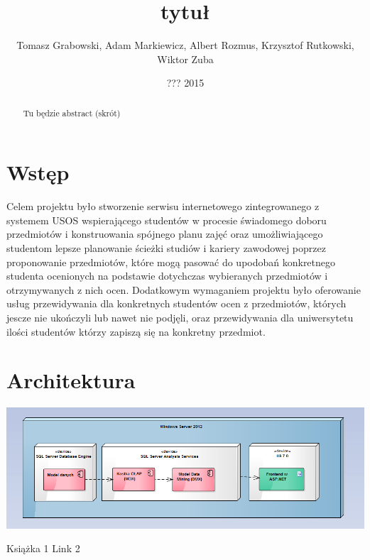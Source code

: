 \documentclass[licencjacka]{pracamgr}
\author{Tomasz Grabowski, Adam Markiewicz, Albert Rozmus, Krzysztof Rutkowski, Wiktor Zuba}
\title{tytuł}
\date{??? 2015}
\begin{document}
\maketitle
\begin{abstract}
Tu będzie abstract (skrót)
\end{abstract}
\tableofcontents
\chapter*{Wstęp}

Celem projektu było stworzenie serwisu internetowego zintegrowanego z systemem USOS 
wspierającego studentów w procesie świadomego doboru przedmiotów i konstruowania spójnego planu zajęć oraz
umożliwiającego studentom lepsze planowanie ścieżki studiów i kariery zawodowej
poprzez proponowanie przedmiotów, które mogą pasować do upodobań konkretnego studenta ocenionych na podstawie dotychczas wybieranych przedmiotów i otrzymywanych z nich ocen.
Dodatkowym wymaganiem projektu było oferowanie usług przewidywania dla konkretnych studentów ocen z przedmiotów, których jescze nie ukończyli lub nawet nie podjęli,
oraz przewidywania dla uniwersytetu ilości studentów którzy zapiszą się na konkretny przedmiot.
 \chapter{Architektura}
 \includegraphics[scale=0.6]{Architektura.png}\newline
\begin{thebibliography}{99}
 Książka 1
 Link 2
\end{thebibliography}
\end{document}
